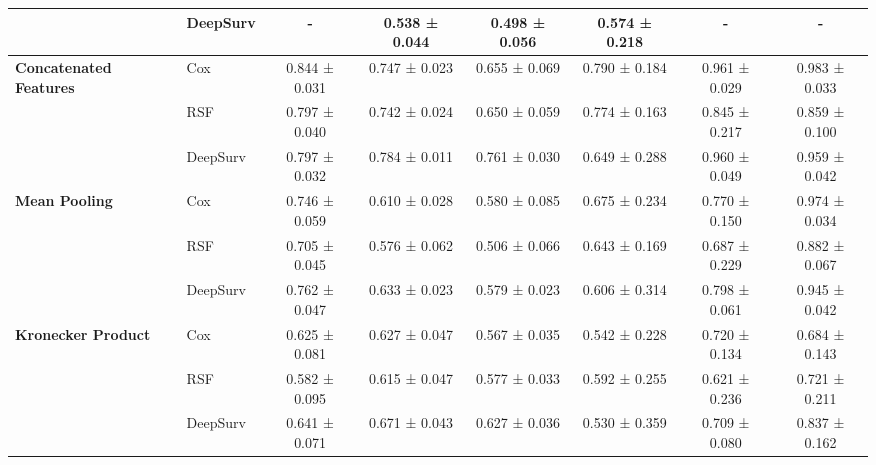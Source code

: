 \begin{sidewaystable}[htbp]
\begin{tabular}{@{}llcccccc@{}}
        & DeepSurv & - & 0.538 ± 0.044 & 0.498 ± 0.056 & 0.574 ± 0.218 & - & - \\
        \midrule
        \multirow{3}{*}{\textbf{Concatenated Features}} & Cox & 0.844 ± 0.031 & 0.747 ± 0.023 & 0.655 ± 0.069 & 0.790 ± 0.184 & 0.961 ± 0.029 & 0.983 ± 0.033 \\
        & RSF & 0.797 ± 0.040 & 0.742 ± 0.024 & 0.650 ± 0.059 & 0.774 ± 0.163 & 0.845 ± 0.217 & 0.859 ± 0.100 \\
        & DeepSurv & 0.797 ± 0.032 & 0.784 ± 0.011 & 0.761 ± 0.030 & 0.649 ± 0.288 & 0.960 ± 0.049 & 0.959 ± 0.042 \\
        \midrule
        \multirow{3}{*}{\textbf{Mean Pooling}} & Cox & 0.746 ± 0.059 & 0.610 ± 0.028 & 0.580 ± 0.085 & 0.675 ± 0.234 & 0.770 ± 0.150 & 0.974 ± 0.034 \\
        & RSF & 0.705 ± 0.045 & 0.576 ± 0.062 & 0.506 ± 0.066 & 0.643 ± 0.169 & 0.687 ± 0.229 & 0.882 ± 0.067 \\
        & DeepSurv & 0.762 ± 0.047 & 0.633 ± 0.023 & 0.579 ± 0.023 & 0.606 ± 0.314 & 0.798 ± 0.061 & 0.945 ± 0.042 \\
        \midrule
        \multirow{3}{*}{\textbf{Kronecker Product}} & Cox & 0.625 ± 0.081 & 0.627 ± 0.047 & 0.567 ± 0.035 & 0.542 ± 0.228 & 0.720 ± 0.134 & 0.684 ± 0.143 \\
        & RSF & 0.582 ± 0.095 & 0.615 ± 0.047 & 0.577 ± 0.033 & 0.592 ± 0.255 & 0.621 ± 0.236 & 0.721 ± 0.211 \\
        & DeepSurv & 0.641 ± 0.071 & 0.671 ± 0.043 & 0.627 ± 0.036 & 0.530 ± 0.359 & 0.709 ± 0.080 & 0.837 ± 0.162 \\
        \bottomrule
    \end{tabular}
\end{sidewaystable}

